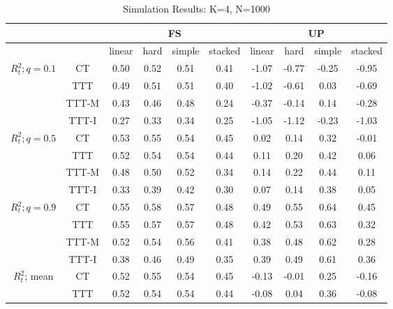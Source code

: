 \documentclass[a4paper,12pt]{article}
\theoremstyle{proposition}
\begin{document}
\begin{table}
\label{tab:results}
\caption{Simulation Results: K=4, N=1000}
\begin{center}
\begin{tabular}{|c|c||c|c|c|c||c|c|c|c|}
\hline
    &  & \multicolumn{4}{|c||}{FS} &  \multicolumn{4}{|c|}{UP} \\
\hline
  &   & linear & hard & simple & stacked & linear & hard & simple & stacked \\
\hline
\hline
\multirow{4}{6em}{$R^2_{t}; q=0.1$}      &    CT &   0.50 &    0.52 &      0.51 &       0.41 &  -1.07 &   -0.77 &     -0.25 &      -0.95  \\
      &   TTT &   0.49 &    0.51 &      0.51 &       0.40 &  -1.02 &   -0.61 &      0.03 &      -0.69  \\
      & TTT-M &   0.43 &    0.46 &      0.48 &       0.24 &  -0.37 &   -0.14 &      0.14 &      -0.28  \\
      & TTT-I &   0.27 &    0.33 &      0.34 &       0.25 &  -1.05 &   -1.12 &     -0.23 &      -1.03  \\
\hline
\hline
\multirow{4}{6em}{$R^2_{t}; q=0.5$}      &    CT &   0.53 &    0.55 &      0.54 &       0.45 &   0.02 &    0.14 &      0.32 &      -0.01  \\
      &   TTT &   0.52 &    0.54 &      0.54 &       0.44 &   0.11 &    0.20 &      0.42 &       0.06  \\
      & TTT-M &   0.48 &    0.50 &      0.52 &       0.34 &   0.14 &    0.22 &      0.44 &       0.11  \\
      & TTT-I &   0.33 &    0.39 &      0.42 &       0.30 &   0.07 &    0.14 &      0.38 &       0.05  \\
\hline
\hline
\multirow{4}{6em}{$R^2_{t}; q=0.9$}      &    CT &   0.55 &    0.58 &      0.57 &       0.48 &   0.49 &    0.55 &      0.64 &       0.45  \\
      &   TTT &   0.55 &    0.57 &      0.57 &       0.48 &   0.42 &    0.53 &      0.63 &       0.32  \\
      & TTT-M &   0.52 &    0.54 &      0.56 &       0.41 &   0.38 &    0.48 &      0.62 &       0.28  \\
      & TTT-I &   0.38 &    0.46 &      0.49 &       0.35 &   0.39 &    0.49 &      0.61 &       0.36  \\
\hline
\hline
\multirow{4}{6em}{$R^2_{t}$; mean}     &    CT &   0.52 &    0.55 &      0.54 &       0.45 &  -0.13 &   -0.01 &      0.25 &      -0.16  \\
     &   TTT &   0.52 &    0.54 &      0.54 &       0.44 &  -0.08 &    0.04 &      0.36 &      -0.08  \\

\end{tabular}
\end{center}
\end{table}
\end{document}
